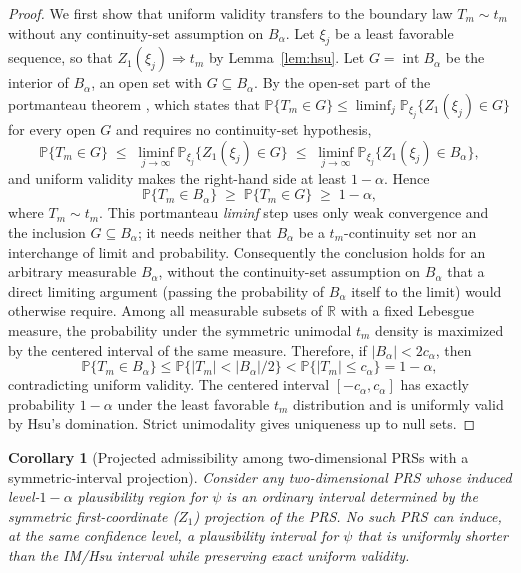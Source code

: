 \documentclass[12pt]{article}
\newtheorem{corollary}{Corollary}
\newcommand{\R}{\mathbb R}
\newcommand{\Prb}{\mathbb P}
\begin{document}
\begin{proof}
We first show that uniform validity transfers to the boundary law
\(T_m\sim t_m\) without any continuity-set assumption on \(B_\alpha\).  Let
\(\xi_j\) be a least favorable sequence, so that \(Z_1(\xi_j)\Rightarrow t_m\)
by Lemma~\ref{lem:hsu}.  Let \(G=\operatorname{int}B_\alpha\) be the interior
of \(B_\alpha\), an open set with \(G\subseteq B_\alpha\).  By the open-set part
of the portmanteau theorem \citep[Theorem~2.1]{Billingsley1999}, which states
that \(\Prb\{T_m\in G\}\leq\liminf_j\Prb_{\xi_j}\{Z_1(\xi_j)\in G\}\) for every
open \(G\) and requires no continuity-set hypothesis,
\[
\Prb\{T_m\in G\}
\;\leq\;
\liminf_{j\to\infty}\Prb_{\xi_j}\{Z_1(\xi_j)\in G\}
\;\leq\;
\liminf_{j\to\infty}\Prb_{\xi_j}\{Z_1(\xi_j)\in B_\alpha\}
,
\]
and uniform validity makes the right-hand side at least \(1-\alpha\).  Hence
\[
\Prb\{T_m\in B_\alpha\}\;\geq\;\Prb\{T_m\in G\}\;\geq\;1-\alpha,
\]
where \(T_m\sim t_m\).  This portmanteau \emph{liminf} step uses only weak
convergence and the inclusion \(G\subseteq B_\alpha\); it needs neither that
\(B_\alpha\) be a \(t_m\)-continuity set nor an interchange of limit and
probability.  Consequently the conclusion holds for an arbitrary measurable
\(B_\alpha\), without the continuity-set assumption on \(B_\alpha\) that a
direct limiting argument (passing the probability of \(B_\alpha\) itself to the
limit) would otherwise require.  Among all measurable subsets of \(\R\) with a fixed
Lebesgue measure, the probability under the symmetric unimodal \(t_m\) density
is maximized by the centered interval of the same measure.  Therefore, if
\(|B_\alpha|<2c_\alpha\), then
\[
\Prb\{T_m\in B_\alpha\}
\leq
\Prb\{|T_m|<|B_\alpha|/2\}
<
\Prb\{|T_m|\leq c_\alpha\}
=1-\alpha,
\]
contradicting uniform validity.  The centered interval
\([-c_\alpha,c_\alpha]\) has exactly probability \(1-\alpha\) under the
least favorable \(t_m\) distribution and is uniformly valid by Hsu's
domination.  Strict unimodality gives uniqueness up to null sets.
\end{proof}

\begin{corollary}[Projected admissibility among two-dimensional PRSs with a
symmetric-interval projection]
\label{cor:proj-admiss}
Consider any two-dimensional PRS whose induced level-\(1-\alpha\) plausibility
region for \(\psi\) is an ordinary interval determined by the symmetric
first-coordinate (\(Z_1\)) projection of the PRS.  No such PRS can induce, at
the same confidence level, a plausibility interval for \(\psi\) that is
uniformly shorter than the IM/Hsu interval while preserving exact
uniform validity.
\end{corollary}
\end{document}

